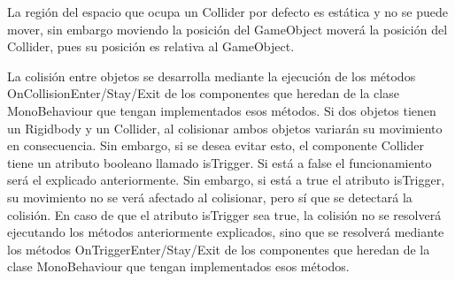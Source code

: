 La región del espacio que ocupa un Collider por defecto es estática y no se puede mover, sin embargo moviendo la posición del GameObject moverá la posición del Collider, pues su posición es relativa al GameObject.

La colisión entre objetos se desarrolla mediante la ejecución de los métodos OnCollisionEnter/Stay/Exit de los componentes que heredan de la clase MonoBehaviour que tengan implementados esos métodos. 
Si dos objetos tienen un Rigidbody y un Collider, al colisionar ambos objetos variarán su movimiento en consecuencia. Sin embargo, si se desea evitar esto, el componente Collider tiene un atributo booleano llamado isTrigger. Si está a false el funcionamiento será el explicado anteriormente. Sin embargo, si está a true el atributo isTrigger, su movimiento no se verá afectado al colisionar, pero sí que se detectará la colisión. En caso de que el atributo isTrigger sea true, la colisión no se resolverá ejecutando los métodos anteriormente explicados, sino que se resolverá mediante los métodos OnTriggerEnter/Stay/Exit de los componentes que heredan de la clase MonoBehaviour que tengan implementados esos métodos.
